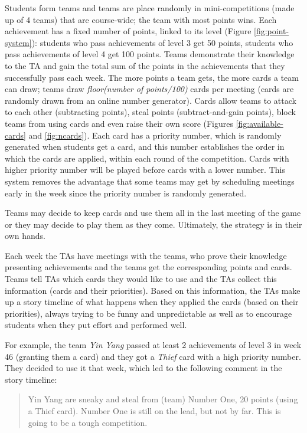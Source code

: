 \documentclass[
]{article}
\begin{document}
Students form teams and teams are place randomly in mini-competitions
(made up of 4 teams) that are course-wide; the team with most points
wins. Each achievement has a fixed number of points, linked to its level
(Figure \ref{fig:point-system}): students who pass achievements of level
3 get 50 points, students who pass achievements of level 4 get 100
points. Teams demonstrate their knowledge to the TA and gain the total
sum of the points in the achievements that they successfully pass each
week. The more points a team gets, the more cards a team can draw; teams
draw \textit{floor(number of points/100)} cards per meeting (cards are
randomly drawn from an online number generator). Cards allow teams to
attack to each other (subtracting points), steal points
(subtract-and-gain points), block teams from using cards and even raise
their own score (Figures \ref{fig:available-cards} and
\ref{fig:ncards}). Each card has a priority number, which is randomly
generated when students get a card, and this number establishes the
order in which the cards are applied, within each round of the
competition. Cards with higher priority number will be played before
cards with a lower number. This system removes the advantage that some
teams may get by scheduling meetings early in the week since the
priority number is randomly generated.

Teams may decide to keep cards and use them all in the last meeting of
the game or they may decide to play them as they come. Ultimately, the
strategy is in their own hands.

Each week the TAs have meetings with the teams, who prove their
knowledge presenting achievements and the teams get the corresponding
points and cards. Teams tell TAs which cards they would like to use and
the TAs collect this information (cards and their priorities). Based on
this information, the TAs make up a story timeline of what happens when
they applied the cards (based on their priorities), always trying to be
funny and unpredictable as well as to encourage students when they put
effort and performed well.

For example, the team \textit{Yin Yang} passed at least 2 achievements
of level 3 in week 46 (granting them a card) and they got a
\textit{Thief} card with a high priority number. They decided to use it
that week, which led to the following comment in the story timeline:

\begin{quote}
Yin Yang are sneaky and steal from (team) Number One, 20 points (using a Thief card).
Number One is still on the lead, but not by far. This is going to be a tough competition.
\end{quote}
\end{document}
